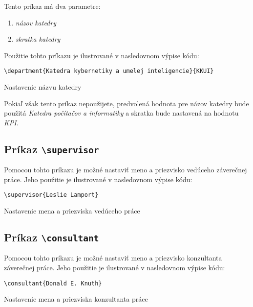 Tento príkaz má dva parametre:

\begin{enumerate}
    \item {\it názov katedry} 
    \item {\it skratka katedry}
\end{enumerate}

Použitie tohto príkazu je ilustrované v nasledovnom výpise kódu:

\begin{listing}[ht]
\begin{verbatim}
\department{Katedra kybernetiky a umelej inteligencie}{KKUI}
\end{verbatim}
\caption{Nastavenie názvu katedry}
\end{listing}

Pokiaľ však tento príkaz nepoužijete, predvolená hodnota pre názov katedry bude použitá {\it Katedra počítačov a informatiky} a skratka bude nastavená na hodnotu {\it KPI}.


\subsection{Príkaz {\tt \textbackslash{}supervisor}}

Pomocou tohto príkazu je možné nastaviť meno a priezvisko vedúceho záverečnej práce. Jeho použitie je ilustrované v nasledovnom výpise kódu:

\begin{listing}[ht]
\begin{verbatim}
\supervisor{Leslie Lamport}
\end{verbatim}
\caption{Nastavenie mena a priezviska vedúceho práce}
\end{listing}


\subsection{Príkaz {\tt \textbackslash{}consultant}}

Pomocou tohto príkazu je možné nastaviť meno a priezvisko konzultanta záverečnej práce. Jeho použitie je ilustrované v nasledovnom výpise kódu:

\begin{listing}[ht!]
\begin{verbatim}
\consultant{Donald E. Knuth}
\end{verbatim}
\caption{Nastavenie mena a priezviska konzultanta práce}
\end{listing}


